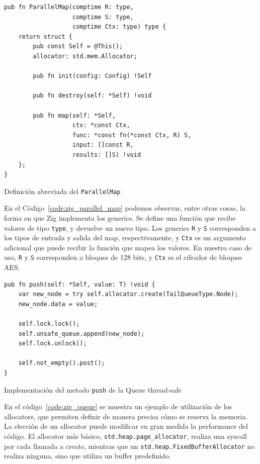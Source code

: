 \documentclass[11pt]{article}
\begin{document}
\begin{listing}
\begin{verbatim}
pub fn ParallelMap(comptime R: type,
                   comptime S: type,
                   comptime Ctx: type) type {
    return struct {
        pub const Self = @This();
        allocator: std.mem.Allocator;

        pub fn init(config: Config) !Self

        pub fn destroy(self: *Self) !void

        pub fn map(self: *Self,
                   ctx: *const Ctx,
                   func: *const fn(*const Ctx, R) S,
                   input: []const R,
                   results: []S) !void
    };
}
\end{verbatim}
\caption{Definición abreviada del \texttt{ParallelMap}}
\label{code:zig_parallel_map}
\end{listing}

En el Código~\ref{code:zig_parallel_map} podemos observar, entre otras cosas, la forma en que Zig implementa los generics. Se define una función que recibe valores de tipo \texttt{type}, y devuelve un nuevo tipo. Los generics \texttt{R} y \texttt{S} corresponden a los tipos de entrada y salida del map, respectivamente, y \texttt{Ctx} es un argumento adicional que puede recibir la función que mapea los valores. En nuestro caso de uso, \texttt{R} y \texttt{S} corresponden a bloques de 128 bits, y \texttt{Ctx} es el cifrador de bloques AES.

\begin{listing}[h]
\begin{verbatim}
pub fn push(self: *Self, value: T) !void {
    var new_node = try self.allocator.create(TailQueueType.Node);
    new_node.data = value;

    self.lock.lock();
    self.unsafe_queue.append(new_node);
    self.lock.unlock();

    self.not_empty().post();
}
\end{verbatim}
\caption{Implementación del metodo \texttt{push} de la Queue thread-safe}
\label{code:zig_queue}
\end{listing}

En el código~\ref{code:zig_queue} se muestra un ejemplo de utilización de los allocators, que permiten definir de manera precisa cómo se reserva la memoria. La elección de un allocator puede modificar en gran medida la performance del código. El allocator más básico, \texttt{std.heap.page_allocator}, realiza una syscall por cada llamada a create, mientras que un \texttt{std.heap.FixedBufferAllocator} no realiza ninguna, sino que utiliza un buffer predefinido.
\end{document}
